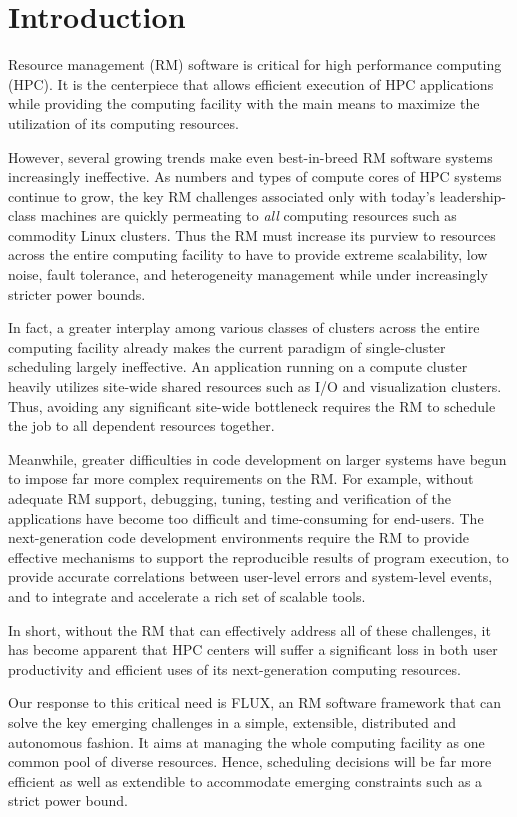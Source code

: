 \section{Introduction}

Resource management (RM) software is critical
for high performance computing (HPC).
It is the centerpiece that allows efficient
execution of HPC applications while providing
the computing facility with the main means
to maximize the utilization of its computing
resources.

However, several growing trends make even
best-in-breed RM software systems increasingly ineffective.
As numbers and types of compute cores of
HPC systems continue to grow, the key RM challenges associated only
with today's leadership-class machines are quickly
permeating to {\em all} computing resources
such as commodity Linux clusters. Thus the RM must increase
its purview to resources across the entire
computing facility to have to provide 
extreme scalability, low noise, fault tolerance,
and heterogeneity management while under increasingly
stricter power bounds.

In fact, a greater interplay among various classes
of clusters across the entire computing facility already 
makes the current paradigm of single-cluster scheduling
largely ineffective. An application running on a compute
cluster heavily utilizes site-wide shared resources
such as I/O and visualization clusters.
Thus, avoiding any significant site-wide bottleneck
requires the RM to schedule the job to all dependent
resources together.

Meanwhile, greater difficulties in code development
on larger systems have begun to impose far more complex
requirements on the RM. For example, without adequate
RM support, debugging, tuning, testing and verification
of the applications have become too difficult
and time-consuming for end-users.
The next-generation code development environments
require the RM to provide effective mechanisms
to support the reproducible results of program execution,
to provide accurate correlations between user-level errors
and system-level events,
and to integrate and accelerate a rich set of scalable tools.

In short, without the RM that can effectively
address all of these challenges, it has become apparent
that HPC centers will suffer a significant loss
in both user productivity and efficient uses of its
next-generation computing resources. 

Our response to this critical need is FLUX,
an RM software framework that can solve the key emerging
challenges in a simple, extensible, distributed
and autonomous fashion.
It aims at managing the whole computing facility
as one common pool of diverse resources.
Hence, scheduling decisions will be far more efficient
as well as extendible to accommodate emerging constraints
such as a strict power bound.

